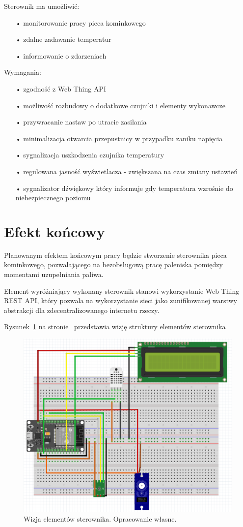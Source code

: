 \documentclass[11pt]{report}
\begin{document}
 Sterownik ma umożliwić:
 \begin{enumerate}
 \item[•] monitorowanie pracy pieca kominkowego
 \item[•] zdalne zadawanie temperatur
 \item[•] informowanie o zdarzeniach
 \end{enumerate}
 
 Wymagania:
 \begin{enumerate}
 \item[•] zgodność z Web Thing API
 \item[•] możliwość rozbudowy o dodatkowe czujniki i elementy wykonawcze
 \item[•] przywracanie nastaw po utracie zasilania
 \item[•] minimalizacja otwarcia przepustnicy w przypadku zaniku napięcia
 \item[•] sygnalizacja uszkodzenia czujnika temperatury
 \item[•] regulowana jasność wyświetlacza - zwiększana na czas zmiany ustawień
 \item[•] sygnalizator dźwiękowy który informuje gdy temperatura wzrośnie do niebezpiecznego poziomu
 \end{enumerate}
 
 \section{Efekt końcowy}
 Planowanym efektem końcowym pracy będzie stworzenie sterownika pieca kominkowego, pozwalającego na bezobsługową pracę paleniska pomiędzy momentami uzupełniania paliwa.

 Element wyróżniający wykonany sterownik stanowi wykorzystanie Web Thing REST API, który pozwala na wykorzystanie sieci jako zunifikowanej warstwy abstrakcji dla zdecentralizowanego internetu rzeczy.
 
 Rysunek~\ref{fig:wizja} na stronie~\pageref{fig:wizja} przedstawia wizję struktury elementów sterownika
 \begin{figure}[ht]
\centering
\includegraphics[width=0.8 \textwidth]{fig/fritzing_bredboard_v1.png}
\caption{Wizja elementów sterownika. Opracowanie własne.}
\label{fig:wizja}
\end{figure}
 
\end{document}

